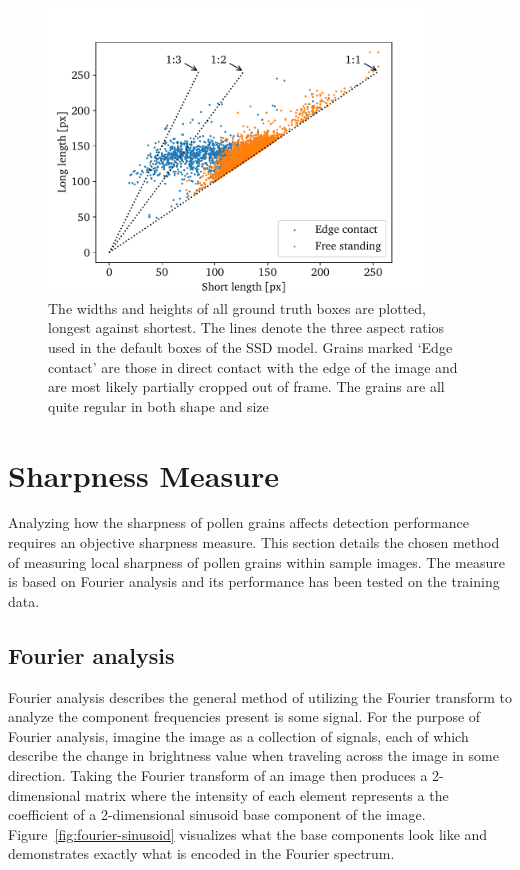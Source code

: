 \begin{figure}[htb]
  \centering
  \includegraphics[width=0.9\textwidth]{figs/method/aspect_ratio.pdf}
  \caption[Aspect ratios in the dataset]{The widths and heights of all ground truth boxes are plotted, longest against shortest.
The lines denote the three aspect ratios used in the default boxes of the SSD model.
Grains marked `Edge contact' are those in direct contact with the edge of the image and are most likely partially cropped out of frame.
The grains are all quite regular in both shape and size}\label{fig:aspect}
\end{figure}

\section{Sharpness Measure}\label{sec:method-sharpness}
Analyzing how the sharpness of pollen grains affects detection performance requires an objective sharpness measure.
This section details the chosen method of measuring local sharpness of pollen grains within sample images.
The measure is based on Fourier analysis and its performance has been tested on the training data.

\subsection{Fourier analysis}
Fourier analysis describes the general method of utilizing the Fourier transform to analyze the component frequencies present is some signal.
For the purpose of Fourier analysis, imagine the image as a collection of signals, each of which describe the change in brightness value when traveling across the image in some direction.
Taking the Fourier transform of an image then produces a 2-dimensional matrix where the intensity of each element represents a the coefficient of a 2-dimensional sinusoid base component of the image.
Figure~\ref{fig:fourier-sinusoid} visualizes what the base components look like and demonstrates exactly what is encoded in the Fourier spectrum.


